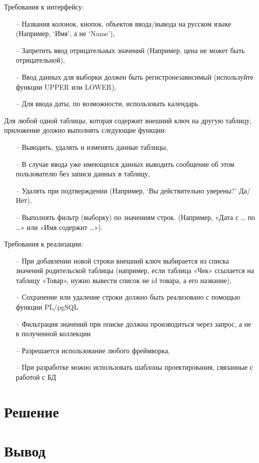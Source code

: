 \documentclass[a4paper,14pt]{extarticle}
\begin{document}
  Требования к интерфейсу:
  \begin{itemize}
    \item[--] Названия колонок, кнопок, объектов ввода/вывода на русском языке (Например, ‘Имя’, а не ‘Name’),
    \item[--] Запретить ввод отрицательных значений (Например, цена не может быть отрицательной),
    \item[--] Ввод данных для выборки должен быть регистронезависимый (используйте функции UPPER или LOWER),
    \item[--] Для ввода даты, по возможности, использовать календарь.
  \end{itemize}

  Для любой одной таблицы, которая содержит внешний ключ на другую таблицу, приложение должно выполнять следующие функции:
  \begin{itemize}
    \item[--] Выводить, удалять и изменять данные таблицы,
    \item[--] В случае ввода уже имеющихся данных выводить сообщение об этом пользователю без записи данных в таблицу,
    \item[--] Удалять при подтверждении (Например, ‘Вы действительно уверены?’ Да/Нет),
    \item[--] Выполнять фильтр (выборку) по значениям строк. (Например, «Дата с … по …» или «Имя содержит …»).
  \end{itemize}

  Требования к реализации:
  \begin{itemize}
    \item[--] При добавлении новой строки внешний ключ выбирается из списка значений родительской таблицы (например, если таблица «Чек» ссылается на таблицу «Товар», нужно вывести список не id товара, а его название),
    \item[--] Сохранение или удаление строки должно быть реализовано с помощью функции PL/pgSQL
    \item[--] Фильтрация значений при поиске должна производиться через запрос, а не в полученной коллекции
    \item[--] Разрешается использование любого фреймворка,
    \item[--] При разработке можно использовать шаблоны проектирования, связанные с работой с БД
  \end{itemize}

  \pagebreak
  \section*{Решение}

  \section*{Вывод}
\end{document}
